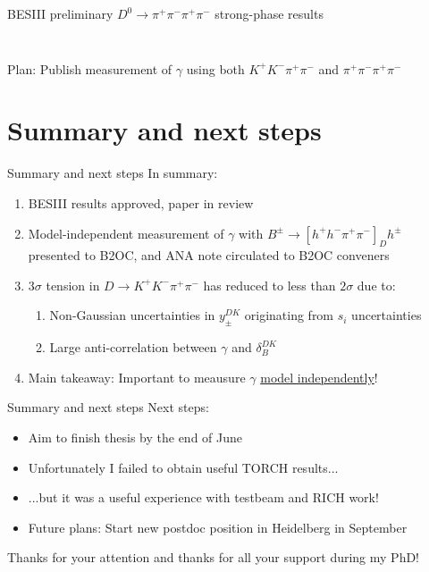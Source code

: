 \documentclass{beamer}
\begin{document}
\begin{frame}{BESIII preliminary $D^0\to\pi^+\pi^-\pi^+\pi^-$ strong-phase results}
\begin{columns}
\begin{column}{0.50\textwidth}
\begin{figure}
      \end{figure}
    \end{column}
  \end{columns}
  \begin{center}
    Plan: Publish measurement of $\gamma$ using both $K^+K^-\pi^+\pi^-$ and $\pi^+\pi^-\pi^+\pi^-$
  \end{center}
\end{frame}

\section{Summary and next steps}

\begin{frame}{Summary and next steps}
  \vspace{0.0cm}
  {\Large In summary:}
  \vspace{0.5cm}
  \begin{enumerate}
    \setlength\itemsep{1.0em}
    \item{BESIII results approved, paper in review}
    \item{Model-independent measurement of $\gamma$ with $B^\pm\to[h^+h^-\pi^+\pi^-]_Dh^\pm$ presented to B2OC, and ANA note circulated to B2OC conveners}
    \item{$3\sigma$ tension in $D\to K^+K^-\pi^+\pi^-$ has reduced to less than $2\sigma$ due to:}
    \begin{enumerate}
      \item{Non-Gaussian uncertainties in $y_\pm^{DK}$ originating from $s_i$ uncertainties}
      \item{Large anti-correlation between $\gamma$ and $\delta_B^{DK}$}
    \end{enumerate}
    \item{Main takeaway: Important to meausure $\gamma$ \underline{model independently}!}
  \end{enumerate}
\end{frame}

\begin{frame}{Summary and next steps}
  \vspace{0.0cm}
  {\Large Next steps:}
  \vspace{0.5cm}
  \begin{itemize}
    \setlength\itemsep{1.0em}
    \item{Aim to finish thesis by the end of June}
    \item{Unfortunately I failed to obtain useful TORCH results...}
    \item{...but it was a useful experience with testbeam and RICH work!}
    \item{Future plans: Start new postdoc position in Heidelberg in September}
  \end{itemize}
  \vspace{0.4cm}
  \begin{center}
    {\huge Thanks for your attention and thanks for all your support during my PhD!}
  \end{center}
\end{frame}
\end{document}
